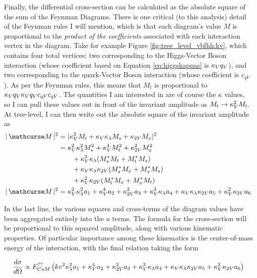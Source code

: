     Finally, the differential cross-section can be calculated as the absolute square of the sum of the Feynman Diagrams.
    There is one critical (to this analysis) detail of the Feynman rules I will mention,
        which is that each diagram's value $M$ is proportional to the \textit{product of the coefficients}
        associated with each interaction vertex in the diagram.
    Take for example Figure \ref{fig:tree_level_vbfhh:kv}, which contains four total vertices;
        two corresponding to the Higgs-Vector Boson interaction (whose coefficient based on Equation \ref{eq:higgskappas} is $\kappa_{V} q_V$),
        and two corresponding to the quark-Vector Boson interaction (whose coefficient is $c_{qV}$).
    As per the Feynman rules, this means that $M_t$ is proportional to $\kappa_{V} q_V \kappa_{V} q_V c_{qV} c_{qV}$.
    The quantities I am interested in are of course the $\kappa$ values,
        so I can pull these values out in front of the invariant amplitude as $M_t \rightarrow \kappa_{V}^2 M_t$.
    At tree-level, I can then write out the absolute square of the invariant amplitude as
    \begin{equation} \begin{split} \label{eq:tree_level_invamp}
        |\invAmp|^2 &= |  \kv^2 M_t + \kv \kl M_s + \kvv M_x |^2
        \\&= \kv^2 \kl^2 M_s^2 + \kv^4 M_t^2 + \kvv^2 M_x^2 
            \\&\qquad + \kv^3 \kl (M_s^* M_t + M_t^* M_s) 
            \\&\qquad + \kv \kl \kvv (M_s^* M_x + M_x^* M_s ) 
            \\&\qquad + \kv^2 \kvv (M_t^* M_x + M_x^* M_t )
        \\|\invAmp|^2 &= \kv^2 \kl^2 a_1 + \kv^4 a_2 + \kvv^2 a_3 + \kv^3 \kl a_4 + \kv \kl \kvv a_5 + \kv^2 \kvv a_6
    \end{split} \end{equation}

    In the last line, the various squares and cross-terms of the diagram values have been aggregated entirely into the $a$ terms.
    The formula for the cross-section will be proportional to this squared amplitude, along with various kinematic properties.
    Of particular importance among these kinematics is the center-of-mass energy of the interaction, with the final relation taking the form

    \begin{equation} \label{eq:dXsec_final} %
        \dXsec \propto E_{CoM}^{??}\left(kv^2 \kl^2 a_1 + \kv^4 a_2 + \kvv^2 a_3 + \kv^3 \kl a_4 + \kv \kl \kvv a_5 + \kv^2 \kvv a_6 \right)
    \end{equation}

